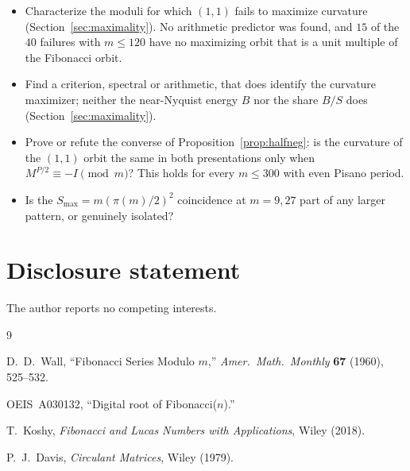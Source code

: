 \documentclass[12pt]{article}
\theoremstyle{remark}
\begin{document}
\begin{itemize}
\item Characterize the moduli for which $(1,1)$ fails to maximize curvature
(Section~\ref{sec:maximality}). No arithmetic predictor was found, and $15$ of the $40$
failures with $m\le 120$ have no maximizing orbit that is a unit multiple of the Fibonacci
orbit.
\item Find a criterion, spectral or arithmetic, that does identify the curvature
maximizer; neither the near-Nyquist energy $B$ nor the share $B/S$ does
(Section~\ref{sec:maximality}).
\item Prove or refute the converse of Proposition~\ref{prop:halfneg}: is the curvature of
the $(1,1)$ orbit the same in both presentations only when $M^{P/2}\equiv -I\pmod m$? This
holds for every $m\le 300$ with even Pisano period.
\item Is the $S_{\max}=m(\pi(m)/2)^2$ coincidence at $m=9,27$ part of any larger pattern,
or genuinely isolated?
\end{itemize}

\section*{Disclosure statement}
\noindent The author reports no competing interests.

\begin{thebibliography}{9}

D.~D.~Wall,
``Fibonacci Series Modulo $m$,''
\textit{Amer.\ Math.\ Monthly} \textbf{67} (1960), 525--532.

OEIS~A030132, ``Digital root of Fibonacci($n$).''

T.~Koshy,
\textit{Fibonacci and Lucas Numbers with Applications},
Wiley (2018).

P.~J.~Davis,
\textit{Circulant Matrices},
Wiley (1979).

\end{thebibliography}
\end{document}
